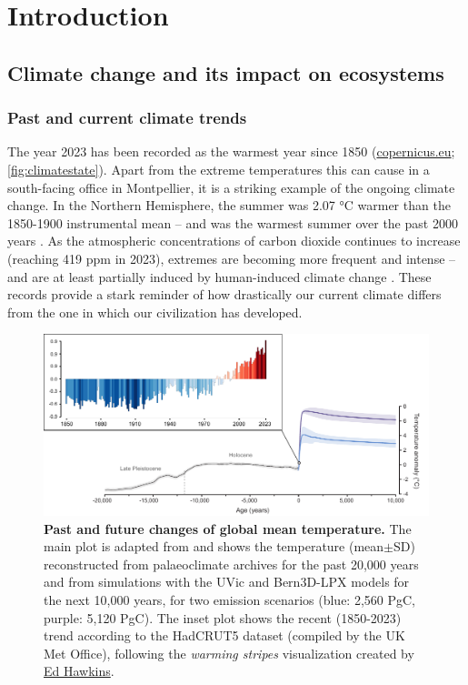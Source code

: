 \section{Introduction}

\vspace*{1cm}

\subsection{Climate change and its impact on ecosystems}

\subsubsection{Past and current climate trends} \label{sec:climate}

The year 2023 has been recorded as the warmest year since 1850 (\href{https://climate.copernicus.eu/copernicus-2023-hottest-year-record}{copernicus.eu}; \autoref{fig:climatestate}). Apart from the extreme temperatures this can cause in a south-facing office in Montpellier, it is a striking example of the ongoing climate change. In the Northern Hemisphere, the summer was 2.07 °C warmer than the 1850-1900 instrumental mean -- and was the warmest summer over the past 2000 years \citep{Esper2024}. As the atmospheric concentrations of carbon dioxide continues to increase (reaching 419 ppm in 2023), extremes are becoming more frequent and intense -- and are at least partially induced by human-induced climate change \citep{Trenberth2015, Diffenbaugh2017}.
These records provide a stark reminder of how drastically our current climate differs from the one in which our civilization has developed.

\begin{figure}[hp]
\hspace*{-0.8cm}
\centering
\includegraphics{0introduction/figs/clark2016_climatestrips.pdf}
\caption{\textbf{Past and future changes of global mean temperature.} The main plot is adapted from \citet{Clark2016} and shows the temperature (mean$\pm$SD) reconstructed from palaeoclimate archives for the past 20,000 years and from simulations with the UVic and Bern3D-LPX models for the next 10,000 years, for two emission scenarios (blue: 2,560 PgC, purple: 5,120 PgC). The inset plot shows the recent (1850-2023) trend according to the HadCRUT5 dataset (compiled by the UK Met Office), following the \emph{warming stripes} visualization created by \href{https://showyourstripes.info/}{Ed Hawkins}.}
\label{fig:climatestate}
\end{figure}

